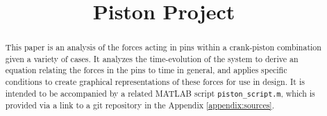 \documentclass[nofoot,pdf-a,balance,colorlinks,upint,subscriptcorrection,varvw,mathalfa=cal=boondoxo]{asmeconf}
\begin{document}

    \title{Piston Project}

    \maketitle

    \begin{abstract}
        This paper is an analysis of the forces acting in pins within a crank-piston combination given a variety of cases. It analyzes the time-evolution of the system to derive an equation relating the forces in the pins to time in general, and applies specific conditions to create graphical representations of these forces for use in design. It is intended to be accompanied by a related MATLAB script \texttt{piston_script.m}, which is provided via a link to a git repository in the Appendix \ref{appendix:sources}.
    \end{abstract}
\end{document}
